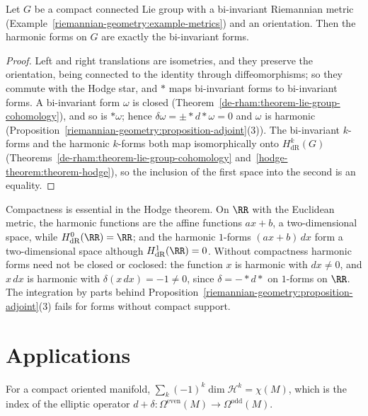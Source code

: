 \begin{proposition}\label{hodge-theorem:proposition-lie-group-harmonic}
Let $G$ be a compact connected Lie group with a bi-invariant Riemannian metric (Example~\ref{riemannian-geometry:example-metrics}) and an orientation. Then the harmonic forms on $G$ are exactly the bi-invariant forms.
\end{proposition}

\begin{proof}
Left and right translations are isometries, and they preserve the orientation, being connected to the identity through diffeomorphisms; so they commute with the Hodge star, and $*$ maps bi-invariant forms to bi-invariant forms. A bi-invariant
form $\omega$ is closed (Theorem~\ref{de-rham:theorem-lie-group-cohomology}), and so is $*\omega$; hence $\delta\omega = \pm{*}d{*}\omega = 0$ and $\omega$ is harmonic (Proposition~\ref{riemannian-geometry:proposition-adjoint}(3)). The
bi-invariant $k$-forms and the harmonic $k$-forms both map isomorphically onto $H^k_{\mathrm{dR}}(G)$ (Theorems~\ref{de-rham:theorem-lie-group-cohomology} and~\ref{hodge-theorem:theorem-hodge}), so the inclusion of the first
space into the second is an equality.
\end{proof}

\begin{counterexample}\label{hodge-theorem:counterexample-compactness}
Compactness is essential in the Hodge theorem. On $\RR$ with the Euclidean metric, the harmonic functions are the affine functions $ax + b$, a two-dimensional space, while $H^0_{\mathrm{dR}}(\RR) = \RR$; and the harmonic $1$-forms $(ax + b)\,dx$
form a two-dimensional space although $H^1_{\mathrm{dR}}(\RR) = 0$. Without compactness harmonic forms need not be closed or coclosed: the function $x$ is harmonic with $dx \neq 0$, and $x\,dx$ is harmonic with $\delta(x\,dx) = -1 \neq 0$, since $\delta = -{*}d{*}$ on $1$-forms on $\RR$. The
integration by parts behind Proposition~\ref{riemannian-geometry:proposition-adjoint}(3) fails for forms without compact support.
\end{counterexample}

\section{Applications}\label{hodge-theorem:section-applications}

\begin{corollary}\label{hodge-theorem:corollary-euler-characteristic}
For a compact oriented manifold, $\sum_k(-1)^k\dim\mathcal{H}^k = \chi(M)$, which is the index of the elliptic operator
$d + \delta \colon \Omega^{\mathrm{even}}(M) \to \Omega^{\mathrm{odd}}(M)$.
\end{corollary}

